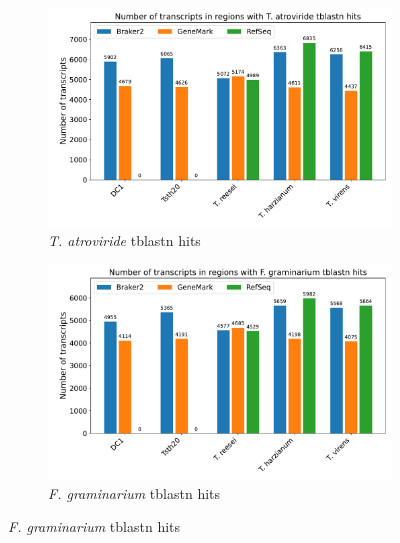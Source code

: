 \begin{figure}[htp]
  \centering
  \begin{subfigure}[b]{0.85\textwidth}
    \includegraphics[width=\textwidth]{figures/blast-tatroviride.pdf}
    \caption{\textit{T. atroviride} tblastn hits}\label{fig:blast-tatroviride}
  \end{subfigure}
  \par\medskip
  \begin{subfigure}[b]{0.85\textwidth}
    \includegraphics[width=\textwidth]{figures/blast-fgraminarium.pdf}
    \caption{\textit{F. graminarium} tblastn hits}\label{fig:blast-fgraminarium}
  \end{subfigure}
\end{figure}
